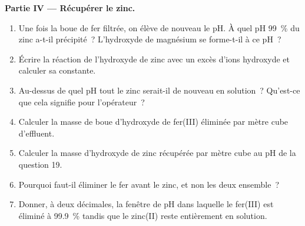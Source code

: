 \begin{problem}
\medskip
\noindent\textbf{Partie IV --- Récupérer le zinc.}
\begin{enumerate}[resume]
  \item Une fois la boue de fer filtrée, on élève de nouveau le pH. À
        quel pH \qty{99}{\percent} du zinc a-t-il précipité~? L'hydroxyde
        de magnésium se forme-t-il à ce pH~?
  \item Écrire la réaction de l'hydroxyde de zinc avec un excès d'ions
        hydroxyde et calculer sa constante.
  \item Au-dessus de quel pH tout le zinc serait-il de nouveau en
        solution~? Qu'est-ce que cela signifie pour l'opérateur~?
  \item Calculer la masse de boue d'hydroxyde de fer(III) éliminée par
        mètre cube d'effluent.
  \item Calculer la masse d'hydroxyde de zinc récupérée par mètre cube au
        pH de la question 19.
  \item Pourquoi faut-il éliminer le fer avant le zinc, et non les deux
        ensemble~?
  \item Donner, à deux décimales, la fenêtre de pH dans laquelle le
        fer(III) est éliminé à \qty{99.9}{\percent} tandis que le zinc(II)
        reste entièrement en solution.
\end{enumerate}
\end{problem}
